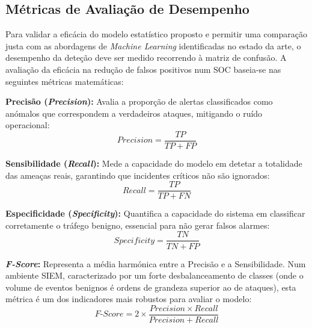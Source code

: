 \documentclass[12pt,a4paper]{article}
\begin{document}
\subsection{Métricas de Avaliação de Desempenho}
Para validar a eficácia do modelo estatístico proposto e permitir uma comparação justa com as abordagens de \textit{Machine Learning} identificadas no estado da arte, o desempenho da deteção deve ser medido recorrendo à matriz de confusão. A avaliação da eficácia na redução de falsos positivos num SOC baseia-se nas seguintes métricas matemáticas:

\textbf{Precisão (\textit{Precision}):} Avalia a proporção de alertas classificados como anómalos que correspondem a verdadeiros ataques, mitigando o ruído operacional:
\begin{equation}
    Precision = \frac{TP}{TP + FP}
\end{equation}

\textbf{Sensibilidade (\textit{Recall}):} Mede a capacidade do modelo em detetar a totalidade das ameaças reais, garantindo que incidentes críticos não são ignorados:
\begin{equation}
    Recall = \frac{TP}{TP + FN}
\end{equation}

\textbf{Especificidade (\textit{Specificity}):} Quantifica a capacidade do sistema em classificar corretamente o tráfego benigno, essencial para não gerar falsos alarmes:
\begin{equation}
    Specificity = \frac{TN}{TN + FP}
\end{equation}

\textbf{\textit{F-Score}:} Representa a média harmónica entre a Precisão e a Sensibilidade. Num ambiente SIEM, caracterizado por um forte desbalanceamento de classes (onde o volume de eventos benignos é ordens de grandeza superior ao de ataques), esta métrica é um dos indicadores mais robustos para avaliar o modelo:
\begin{equation}
    F\text{-}Score = 2 \times \frac{Precision \times Recall}{Precision + Recall}
\end{equation}
\end{document}
